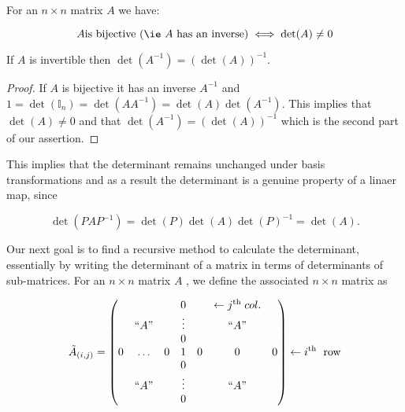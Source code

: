 \documentclass[a4paper,12pt]{report}
\begin{document}
\begin{corollary}\label{invertibledeterminant} 

For an \(n \times n\) matrix \(A\) we have:

\begin{equation}
    A \text{is bijective (\ie \(A\) has an inverse)} \iff \det (A) \neq 0  
\end{equation}

If \(A\) is invertible then \(\det (A^{-1} ) = (\det (A))^{-1} \). 
  
\end{corollary}

\begin{proof}
If $A$ is bijective it has an inverse $A^{-1}$ and $1 = \det(\mathbb{I}_n) = \det(AA^{-1}) = \det(A) \det(A^{-1})$. This implies that $\det(A) \neq 0$ and that $\det(A^{-1}) = (\det(A))^{-1}$ which is the second part of our assertion.
\end{proof}

This implies that the determinant remains unchanged under basis transformations and as a result the determinant is a genuine property of a linaer map, since

\begin{equation}
    \det (PAP^{-1} ) = \det (P)\det (A)\det (P)^{-1} =\det (A).
\end{equation}

Our next goal is to find a recursive method to calculate the determinant, essentially by writing the determinant of a matrix in terms of determinants of sub-matrices. For an \(n\times n\) matrix \(A\) , we define the associated \(n \times  n\)  matrix as


\begin{equation}
    \tilde{A}_{(i,j)} = 
\begin{pmatrix}
     &  &  & 0 &  & \leftarrow  j^{\text{th }} col. &   \\
     & ``A\text{''}  &  & \vdots  &  & ``A\text{''}  &   \\
     &  &  & 0 &  &  &   \\
    0 & \ldots  & 0 & 1 & 0 & 0 & 0  \\
     &  &  & 0 &  &  &   \\
     & ``A\text{''}  &  & \vdots  &  & ``A\text{''}  &   \\
     &  &  & 0 &  &  &   \\
\end{pmatrix}
\leftarrow i^{\text{th }}  \text{ row}
\end{equation}
\end{document}
